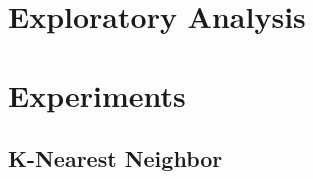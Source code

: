 \documentclass[paper=a4, fontsize=11pt]{scrartcl}
\numberwithin{equation}{section}
\numberwithin{figure}{section}
\numberwithin{table}{section}
\begin{document}

\section{Exploratory Analysis}





\section{Experiments}

\subsection{K-Nearest Neighbor}
\end{document}
